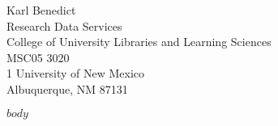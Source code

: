 \documentclass[11pt]{ULletter}
\begin{document}
\begin{letter}{Karl Benedict\\ 
               Research Data Services\\ 
               College of University Libraries and Learning Sciences\\
               MSC05 3020\\ 
               1 University of New Mexico\\
               Albuquerque, NM 87131}

$body$

\end{letter}
\end{document}
